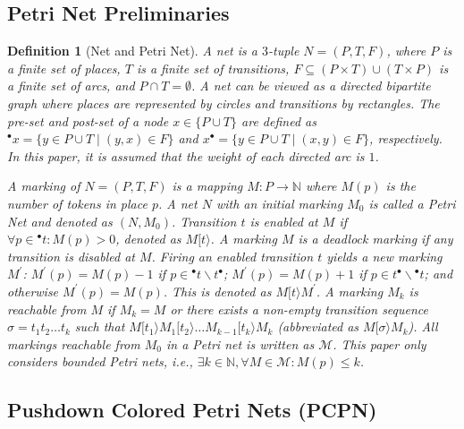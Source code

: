 \documentclass[sigconf]{acmart}
\newtheorem{definition}{Definition}
\begin{document}
\subsection{Petri Net Preliminaries}
\label{sec:method:pn}
\begin{definition}[Net and Petri Net]
\label{def:pn}
A net is a $3$-tuple $N=(P,T,F)$, where $P$ is a finite set of places, $T$ is a finite set of transitions,
$F\subseteq (P\times T) \cup (T\times P)$ is a finite set of arcs, and $P\cap T=\emptyset$.
A net can be viewed as a directed bipartite graph where places are represented by circles and transitions by rectangles.
The pre-set and post-set of a node $x \in\{P \cup T\}$ are defined as
$^{\bullet}x=\{y\in P\cup T\mid (y,x)\in F\}$ and $x^{\bullet}=\{y\in P\cup T\mid (x,y)\in F\}$, respectively.
In this paper, it is assumed that the weight of each directed arc is $1$.

A marking of $N=(P,T,F)$ is a mapping $M:P\rightarrow \mathbb{N}$ where $M(p)$ is the number of tokens in place $p$.
A net $N$ with an initial marking $M_{0}$ is called a Petri Net and denoted as $(N,M_{0})$.
Transition $t$ is enabled at $M$ if $\forall p\in {}^{\bullet}t: M(p)>0$, denoted as $M[t\rangle$.
A marking $M$ is a deadlock marking if any transition is disabled at $M$.
Firing an enabled transition $t$ yields a new marking $M^{\prime}$:
$M^{\prime}(p)=M(p)-1$ if $p\in {}^{\bullet}t\backslash t^{\bullet}$;
$M^{\prime}(p)=M(p)+1$ if $p\in t^{\bullet}\backslash {}^{\bullet}t$;
and otherwise $M^{\prime}(p)=M(p)$.
This is denoted as $M[t\rangle M^{\prime}$.
A marking $M_{k}$ is reachable from $M$ if $M_{k}=M$ or there exists a non-empty transition sequence
$\sigma=t_{1}t_{2}\dots t_{k}$ such that
$M[t_{1}\rangle M_{1}[t_{2}\rangle \dots M_{k-1}[t_{k}\rangle M_{k}$ (abbreviated as $M[\sigma \rangle M_{k}$).
All markings reachable from $M_{0}$ in a Petri net is written as $\mathcal{M}$.
This paper only considers bounded Petri nets, i.e.,
$\exists k\in \mathbb{N},\forall{M}\in \mathcal{M}:M(p)\leq k$.
\end{definition}

\subsection{Pushdown Colored Petri Nets (PCPN)}
\label{sec:method:pcpn}
\end{document}
